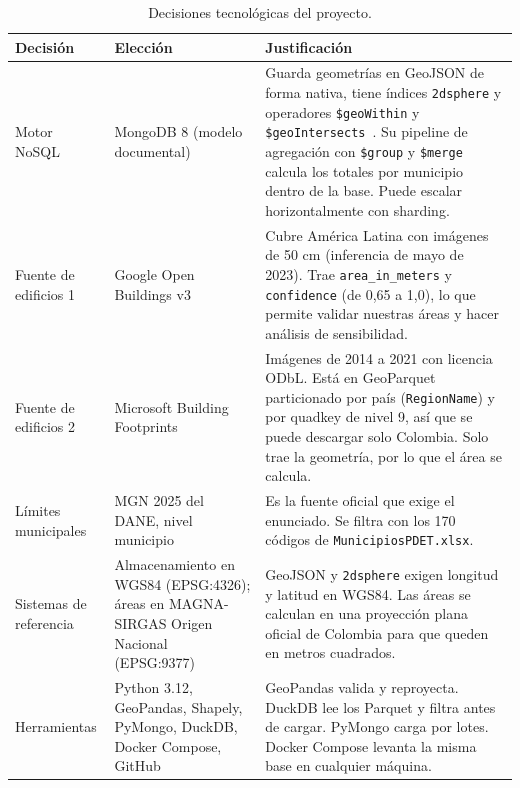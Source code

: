 \documentclass[11pt,a4paper]{article}
\newcommand{\campo}[1]{\texttt{#1}}
\begin{document}
\begin{table}[H]
\centering
\small
\caption{Decisiones tecnológicas del proyecto.}
\label{tab:decisiones}
\begin{tabularx}{\textwidth}{@{}p{2.6cm}p{3.6cm}L@{}}
\toprule
\textbf{Decisión} & \textbf{Elección} & \textbf{Justificación} \\
\midrule
Motor NoSQL & MongoDB 8 (modelo documental) &
  Guarda geometrías en GeoJSON de forma nativa, tiene índices \campo{2dsphere}
  y operadores \campo{\$geoWithin} y \campo{\$geoIntersects}~\cite{mongodb}.
  Su pipeline de agregación con \campo{\$group} y \campo{\$merge} calcula los
  totales por municipio dentro de la base. Puede escalar horizontalmente con
  sharding. \\
Fuente de edificios 1 & Google Open Buildings v3~\cite{google} &
  Cubre América Latina con imágenes de 50 cm (inferencia de mayo de 2023).
  Trae \campo{area\_in\_meters} y \campo{confidence} (de 0,65 a 1,0), lo que
  permite validar nuestras áreas y hacer análisis de sensibilidad. \\
Fuente de edificios 2 & Microsoft Building Footprints~\cite{microsoft} &
  Imágenes de 2014 a 2021 con licencia ODbL. Está en GeoParquet particionado
  por país (\campo{RegionName}) y por quadkey de nivel 9, así que se puede
  descargar solo Colombia. Solo trae la geometría, por lo que el área se
  calcula. \\
Límites municipales & MGN 2025 del DANE, nivel municipio~\cite{mgn} &
  Es la fuente oficial que exige el enunciado. Se filtra con los 170 códigos
  de \campo{MunicipiosPDET.xlsx}. \\
Sistemas de referencia & Almacenamiento en WGS84 (EPSG:4326); áreas en
  MAGNA-SIRGAS Origen Nacional (EPSG:9377) &
  GeoJSON y \campo{2dsphere} exigen longitud y latitud en WGS84. Las áreas se
  calculan en una proyección plana oficial de Colombia para que queden en
  metros cuadrados. \\
Herramientas & Python 3.12, GeoPandas, Shapely, PyMongo, DuckDB, Docker
  Compose, GitHub &
  GeoPandas valida y reproyecta. DuckDB lee los Parquet y filtra antes de
  cargar. PyMongo carga por lotes. Docker Compose levanta la misma base en
  cualquier máquina. \\
\bottomrule
\end{tabularx}
\end{table}


\end{document}
